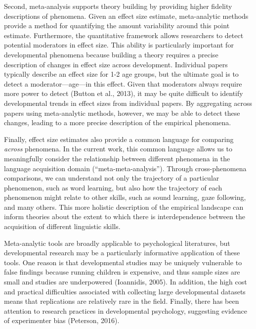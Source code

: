 \documentclass[english,floatsintext,man]{apa6}
\begin{document}
Second, meta-analysis supports theory building by providing higher
fidelity descriptions of phenomena. Given an effect size estimate,
meta-analytic methods provide a method for quantifying the amount
variability around this point estimate. Furthermore, the quantitative
framework allows researchers to detect potential moderators in effect
size. This ability is particularly important for developmental phenomena
because building a theory requires a precise description of changes in
effect size across development. Individual papers typically describe an
effect size for 1-2 age groups, but the ultimate goal is to detect a
moderator---age---in this effect. Given that moderators always require
more power to detect (Button et al., 2013), it may be quite difficult to
identify developmental trends in effect sizes from individual papers. By
aggregating across papers using meta-analytic methods, however, we may
be able to detect these changes, leading to a more precise description
of the empirical phenomena.

Finally, effect size estimates also provide a common language for
comparing \emph{across} phenomena. In the current work, this common
language allows us to meaningfully consider the relationship between
different phenomena in the language acquisition domain
(\enquote{meta-meta-analysis}). Through cross-phenomena comparisons, we
can understand not only the trajectory of a particular phenomenon, such
as word learning, but also how the trajectory of each phenomenon might
relate to other skills, such as sound learning, gaze following, and many
others. This more holistic description of the empirical landscape can
inform theories about the extent to which there is interdependence
between the acquisition of different linguistic skills.

Meta-analytic tools are broadly applicable to psychological literatures,
but developmental research may be a particularly informative application
of these tools. One reason is that developmental studies may be uniquely
vulnerable to false findings because running children is expensive, and
thus sample sizes are small and studies are underpowered (Ioannidis,
2005). In addition, the high cost and practical difficulties associated
with collecting large developmental datasets means that replications are
relatively rare in the field. Finally, there has been attention to
research practices in developmental psychology, suggesting evidence of
experimenter bias (Peterson, 2016).
\end{document}
